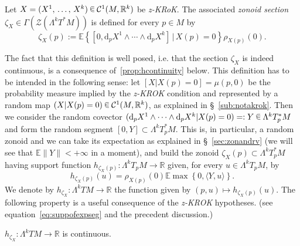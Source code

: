 \documentclass[AHL, Unicode, longabstracts, published]{cedram}
\newcommand{\R}{\mathbb{R}}
\newcommand{\EE}{\mathbb{E}}
\newcommand{\ZZ}{\mathscr{Z}}
\newcommand{\dd}{\mathrm{d}}
\newcommand{\mC}{\mathcal{C}}
\newcommand{\zkrok}{\emph{z-KROK}\xspace}
\newcommand*\randin{
\mathchoice {\raisebox{-.35ex}{$\displaystyle{^\subset}$}\mkern-11.5mu\raisebox{+.45ex}{$\displaystyle{_\subset}$}} {\mkern+1mu\raisebox{-.27ex}{$\textstyle{^\subset}$}\mkern-11.7mu\raisebox{+.45ex}{$\textstyle{_\subset}$}} {\raisebox{.35ex}{$\scriptstyle\subset$}\mkern-14mu\raisebox{-.15ex}{$\scriptstyle\subset$}} {\raisebox{.3ex}{$\scriptscriptstyle\subset$}\mkern-13.5mu\raisebox{-.10ex}{$\scriptscriptstyle\subset$}}}
\begin{document}
\begin{defi}\label{def:zonoidsec}
Let $X=(X^1,\,\ldots,\,X^k)\,\randin\, \mC^1(M,\R^k)$ be \emph{z-KRoK}. The associated \emph{zonoid section} $\zeta_X\in \Gamma(\ZZ(\Lambda^k T^*M))$ is defined for every $p\in M$ by
\begin{equation*}
\zeta_X(p):=\EE\left\{\left[0,\dd_pX^1\wedge\cdots\wedge\dd_p X^k\right]\,\Big|\,X(p)=0\right\}\rho_{X(p)}(0).
\end{equation*}
\end{defi}

The fact that this definition is well posed, i.e. that the section $\zeta_X$ is indeed continuous, is a consequence of~\cref{prop:hcontinuity} below. This definition has to be intended in the following sense: let $[X|X(p)=0]=\mu(p,0)$ be the probability measure implied by the {\zkrok} condition and represented by a random map $(X|X(p)=0)\,\randin\, \mC^1(M,\R^k)$, as explained in \S~\ref{sub:notakrok}. Then we consider the random covector $(\dd_pX^1\wedge\cdots\wedge\dd_p X^k|X(p)=0)=:Y\,\randin\, \Lambda^kT_p^*M$ and form the random segment $[0,Y]\subset \Lambda^kT^*_pM$. This is, in particular, a random zonoid and we can take its expectation as explained in \S~\ref{sec:zonandrv} (we will see that $\EE\|Y\|<+\infty$ in a moment), and build the zonoid $\zeta_X(p)\subset \Lambda^kT^*_pM$ having support function $ h_{\zeta_{X}(p)}\colon \Lambda^kT_pM\to \R$ given, for every $u\in\Lambda^kT_pM$, by
\begin{equation*}
h_{\zeta_X(p)}(u)=\rho_{X(p)}(0) \EE\max\left\{0,\langle Y,u\rangle \right\}.
\end{equation*}
We denote by $h_{\zeta_X}\colon \Lambda^kTM\to\R$ the function given by $(p,u)\mapsto h_{\zeta_X(p)}(u)$. The following property is a useful consequence of the {\zkrok} hypotheses. (see equation~\eqref{eq:suppofexpseg} and the precedent discussion.)

\begin{prop}\label{prop:hcontinuity}
$h_{\zeta_X}\colon \Lambda^kTM\to \R$ is continuous.
\end{prop}
\end{document}
